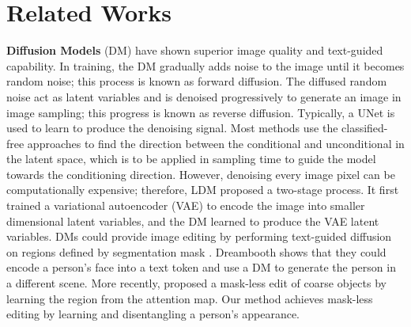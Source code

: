 \documentclass[10pt,twocolumn,letterpaper]{article}
\begin{document}
\section{Related Works}
\textbf{Diffusion Models} (DM) \cite{diffusion_model, Dhariwal2021} have shown superior image quality and text-guided capability. In training, the DM gradually adds noise to the image until it becomes random noise; this process is known as forward diffusion. The diffused random noise act as latent variables and is denoised progressively to generate an image in image sampling; this progress is known as reverse diffusion. Typically, a UNet\cite{unet} is used to learn to produce the denoising signal. Most methods\cite{dalle2,imagen,glide} use the classified-free approaches\cite{Ho2021} to find the direction between the conditional and unconditional in the latent space, which is to be applied in sampling time to guide the model towards the conditioning direction. However, denoising every image pixel can be computationally expensive; therefore, LDM\cite{ldm} proposed a two-stage process. It first trained a variational autoencoder (VAE) \cite{vae} to encode the image into smaller dimensional latent variables, and the DM learned to produce the VAE latent variables. DMs could provide image editing by performing text-guided diffusion on regions defined by segmentation mask \cite{glide,dalle2, imagen,blended_diffusion,blended_latent_diffusion}. Dreambooth\cite{dreambooth} shows that they could encode a person's face into a text token and use a DM to generate the person in a different scene. More recently, \cite{prompt2prompt} proposed a mask-less edit of coarse objects by learning the region from the attention map. Our method achieves mask-less editing by learning and disentangling a person's appearance.
\end{document}
